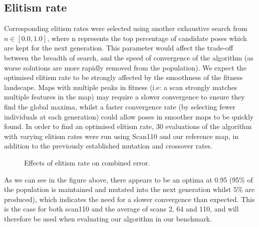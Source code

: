 \documentclass[authoryearcitations]{UoYCSproject}
\begin{document}
\subsection{Elitism rate}
\label{subsec:elite_elitism_rate}
Corresponding elitism rates were selected using another exhaustive search from $n \in [0.0,1.0]$, where n represents the top percentage of candidate poses which are kept for the next generation. This parameter would affect the trade-off between the breadth of search, and the speed of convergence of the algorithm (as worse solutions are more rapidly removed from the population). We expect the optimised elitism rate to be strongly affected by the smoothness of the fitness landscape. Maps with multiple peaks in fitness (i.e: a scan strongly matches multiple features in the map) may require a slower convergence to ensure they find the global maxima, whilst a faster convergence rate (by selecting fewer individuals at each generation) could allow poses in smoother maps to be quickly found. In order to find an optimised elitism rate, 30 evaluations of the algorithm with varying elitism rates were run using Scan110 and our reference map, in addition to the previously established mutation and crossover rates. \newline

\begin{figure}
	\centering
	\caption[Optimising elitism rate for scan/map]{Effects of elitism rate on combined error.}
	\label{fig:elitsm_rates}
\end{figure}
As we can see in the figure above, there appears to be an optima at 0.95 (95\% of the population is maintained and mutated into the next generation whilst 5\% are produced), which indicates the need for a slower convergence than expected. This is the case for both scan110 and the average of scans 2, 64 and 110, and will therefore be used when evaluating our algorithm in our benchmark.
\end{document}
